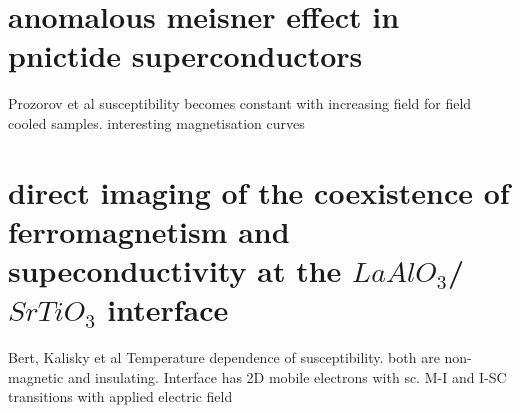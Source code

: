 \documentclass[a4paper,11pt]{article}
\begin{document}
\section{anomalous meisner effect in pnictide superconductors}
Prozorov et al
susceptibility becomes constant with increasing field for field cooled samples.
interesting magnetisation curves
\section{direct imaging of the coexistence of ferromagnetism and supeconductivity at the $LaAlO_3$/$SrTiO_3$ interface}
Bert, Kalisky et al
Temperature dependence of susceptibility.
both are non-magnetic and insulating.
Interface has 2D mobile electrons with sc.
M-I and I-SC transitions with applied electric field
\end{document}
